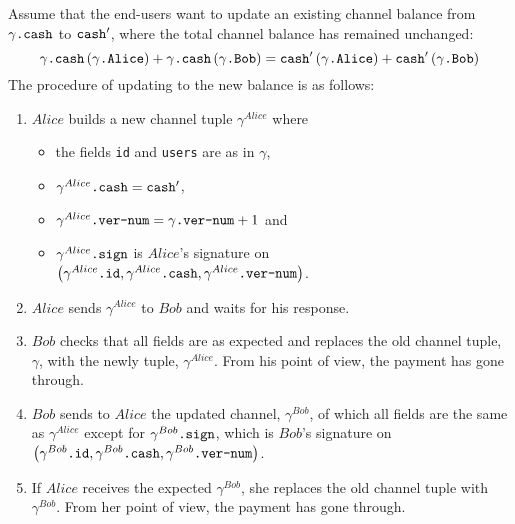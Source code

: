   Assume that the end-users want to update an existing channel balance from
  $\gamma\mbox{\texttt{.cash}}$ to $\mbox{\texttt{cash}}'$, where the total channel
  balance has remained unchanged:
  \begin{equation*}
    \gamma\mbox{\texttt{.cash}}\left(\gamma\mbox{\texttt{.Alice}}\right) +
    \gamma\mbox{\texttt{.cash}}\left(\gamma\mbox{\texttt{.Bob}}\right) =
    \mbox{\texttt{cash}}'\left(\gamma\mbox{\texttt{.Alice}}\right) +
    \mbox{\texttt{cash}}'\left(\gamma\mbox{\texttt{.Bob}}\right)
  \end{equation*}
  The procedure of updating to the new balance is as follows:
  \begin{enumerate}
    \item $Alice$ builds a new channel tuple $\gamma^{Alice}$ where
    \begin{itemize}
      \item the fields \texttt{id} and \texttt{users} are as in $\gamma$,
      \item $\gamma^{Alice}\mbox{\texttt{.cash}} = \mbox{\texttt{cash}}'$,
      \item $\gamma^{Alice}\mbox{\texttt{.ver-num}} = \gamma\mbox{\texttt{.ver-num}} + 1$
      and
      \item $\gamma^{Alice}\mbox{\texttt{.sign}}$ is $Alice$'s signature on \newline
      $\left(\gamma^{Alice}\mbox{\texttt{.id}}, \gamma^{Alice}\mbox{\texttt{.cash}},
      \gamma^{Alice}\mbox{\texttt{.ver-num}}\right)$.
    \end{itemize}
    \item $Alice$ sends $\gamma^{Alice}$ to $Bob$ and waits for his response.
    \item $Bob$ checks that all fields are as expected and replaces the old channel tuple,
    $\gamma$, with the newly tuple, $\gamma^{Alice}$. From his point of view, the payment
    has gone through.
    \item $Bob$ sends to $Alice$ the updated channel, $\gamma^{Bob}$, of which all fields
    are the same as $\gamma^{Alice}$ except for $\gamma^{Bob}\mbox{\texttt{.sign}}$, which
    is $Bob$'s signature on $\left(\gamma^{Bob}\mbox{\texttt{.id}},
    \gamma^{Bob}\mbox{\texttt{.cash}}, \gamma^{Bob}\mbox{\texttt{.ver-num}}\right)$.
    \item If $Alice$ receives the expected $\gamma^{Bob}$, she replaces the old channel
    tuple with $\gamma^{Bob}$. From her point of view, the payment has gone through.
  \end{enumerate}


